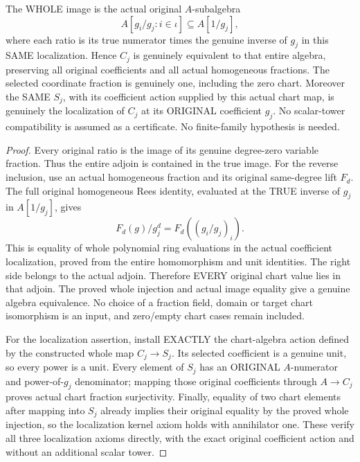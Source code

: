 \begin{theorem}
\label{algebra:actual-rees-chart-away-equivalence}
\leanok
The WHOLE image is the actual original $A$-subalgebra
\[
 A[g_i/g_j:i\in\iota]\subseteq A[1/g_j],
\]
where each ratio is its true numerator times the genuine inverse of
$g_j$ in this SAME localization. Hence $C_j$ is genuinely equivalent
to that entire algebra, preserving all original coefficients and all
actual homogeneous fractions. The selected coordinate fraction is genuinely one, including the zero chart.
Moreover the SAME $S_j$, with its coefficient action supplied by this
actual chart map, is genuinely the localization of $C_j$ at its ORIGINAL
coefficient $g_j$. No scalar-tower compatibility is assumed as a certificate.
No finite-family hypothesis is needed.
\end{theorem}
\begin{proof}
Every original ratio is the image of its genuine degree-zero variable
fraction. Thus the entire adjoin is contained in the true image.
For the reverse inclusion, use an actual homogeneous fraction and its
original same-degree lift $F_d$. The full original homogeneous Rees
identity, evaluated at the TRUE inverse of $g_j$ in $A[1/g_j]$, gives
\[
 F_d(g)/g_j^d=F_d((g_i/g_j)_i).
\]
This is equality of whole polynomial ring evaluations in the actual
coefficient localization, proved from the entire homomorphism and
unit identities. The right side belongs to the actual adjoin.
Therefore EVERY original chart value lies in that adjoin. The proved
whole injection and actual image equality give a genuine algebra
equivalence. No choice of a fraction field, domain or target chart
isomorphism is an input, and zero/empty chart cases remain included.

For the localization assertion, install EXACTLY the chart-algebra action
defined by the constructed whole map $C_j\to S_j$. Its selected coefficient
is a genuine unit, so every power is a unit. Every element of $S_j$ has an
ORIGINAL $A$-numerator and power-of-$g_j$ denominator; mapping those original
coefficients through $A\to C_j$ proves actual chart fraction surjectivity.
Finally, equality of two chart elements after mapping into $S_j$ already
implies their original equality by the proved whole injection, so the
localization kernel axiom holds with annihilator one. These verify all
three localization axioms directly, with the exact original coefficient
action and without an additional scalar tower.
\end{proof}

